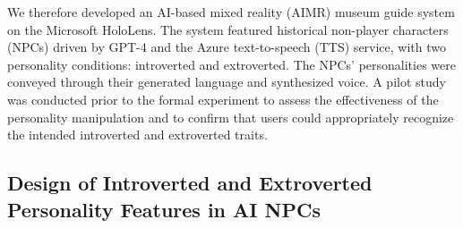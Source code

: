 \documentclass[a4paper,fleqn]{cas-sc}
\begin{document}
We therefore developed an AI-based mixed reality (AIMR) museum guide system on the Microsoft HoloLens. The system featured historical non-player characters (NPCs) driven by GPT-4 and the Azure text-to-speech (TTS) service, with two personality conditions: introverted and extroverted. The NPCs' personalities were conveyed through their generated language and synthesized voice. A pilot study was conducted prior to the formal experiment to assess the effectiveness of the personality manipulation and to confirm that users could appropriately recognize the intended introverted and extroverted traits.

\subsection{Design of Introverted and Extroverted Personality Features in AI NPCs}
\end{document}

